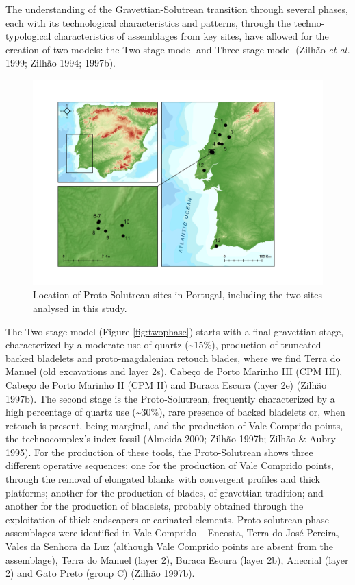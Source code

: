 \documentclass[12pt,twoside]{reedthesis}
\begin{document}
The understanding of the Gravettian-Solutrean transition through several phases, each with its technological characteristics and patterns, through the techno-typological characteristics of assemblages from key sites, have allowed for the creation of two models: the Two-stage model and Three-stage model (Zilhão \emph{et al.} 1999; Zilhão 1994; 1997b).
\begin{figure}[H]

{\centering \includegraphics[width=0.8\linewidth]{figure/map_proto_solutrean} 

}

\caption{Location of Proto-Solutrean sites in Portugal, including the two sites analysed in this study.}\label{fig:protomap}
\end{figure}
The Two-stage model (Figure \ref{fig:twophase}) starts with a final gravettian stage, characterized by a moderate use of quartz (\textasciitilde15\%), production of truncated backed bladelets and proto-magdalenian retouch blades, where we find Terra do Manuel (old excavations and layer 2s), Cabeço de Porto Marinho III (CPM III), Cabeço de Porto Marinho II (CPM II) and Buraca Escura (layer 2e) (Zilhão 1997b). The second stage is the Proto-Solutrean, frequently characterized by a high percentage of quartz use (\textasciitilde30\%), rare presence of backed bladelets or, when retouch is present, being marginal, and the production of Vale Comprido points, the technocomplex's index fossil (Almeida 2000; Zilhão 1997b; Zilhão \& Aubry 1995). For the production of these tools, the Proto-Solutrean shows three different operative sequences: one for the production of Vale Comprido points, through the removal of elongated blanks with convergent profiles and thick platforms; another for the production of blades, of gravettian tradition; and another for the production of bladelets, probably obtained through the exploitation of thick endscapers or carinated elements. Proto-solutrean phase assemblages were identified in Vale Comprido -- Encosta, Terra do José Pereira, Vales da Senhora da Luz (although Vale Comprido points are absent from the assemblage), Terra do Manuel (layer 2), Buraca Escura (layer 2b), Anecrial (layer 2) and Gato Preto (group C) (Zilhão 1997b).
\end{document}
